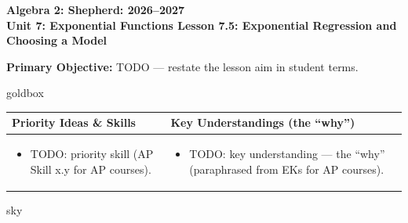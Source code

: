 \documentclass[10pt]{article}
\newcommand{\CourseName}{Algebra 2: Shepherd}
\newcommand{\SchoolYear}{2026--2027}
\newcommand{\UnitNumberName}{Unit 7: Exponential Functions \quad}
\newcommand{\LessonNumberName}{Lesson 7.5: Exponential Regression and Choosing a Model}
\begin{document}
\begin{center}
    {\Large\bfseries \CourseName: \SchoolYear \\
    {\small\bfseries \UnitNumberName \LessonNumberName}}
\end{center}

\begin{tcolorbox}[colback=forestbg, colframe=forest, boxrule=0.9pt, arc=2mm,
    left=2mm, right=2mm, top=1.5mm, bottom=1.5mm]
    \textbf{Primary Objective:} TODO --- restate the lesson aim in student terms.
\end{tcolorbox}

\renewcommand{\arraystretch}{1.4}
\begin{skillbox}{goldbox}
\begin{tabularx}{\linewidth}{@{}X|X@{}}
\textbf{Priority Ideas \& Skills} & \textbf{Key Understandings (the ``why'')} \\[2pt]
\hline
\vspace{-6pt}
\begin{itemize}[leftmargin=1.1em, nosep, after=\vspace{2pt}]
  \item TODO: priority skill (AP Skill x.y for AP courses).
\end{itemize}
&
\vspace{-6pt}
\begin{itemize}[leftmargin=1.1em, nosep, after=\vspace{2pt}]
  \item TODO: key understanding --- the ``why'' (paraphrased from EKs for AP courses).
\end{itemize}
\end{tabularx}
\end{skillbox}

\begin{skillbox}{sky}
\end{skillbox}
\end{document}
